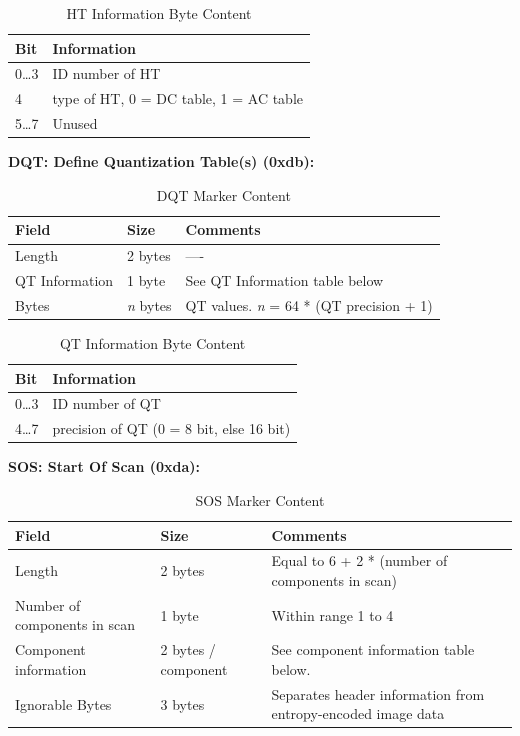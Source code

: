 \begin{table}[!hbtp]
	\caption{HT Information Byte Content}
	\centering
	\begin{tabular}{ | p{2cm} | p{4cm} | }
	\hline
	\textbf{Bit} &  \textbf{Information} \\ \hline
	0\ldots3 & ID number of HT\\ \hline
	4 & type of HT, 0 = DC table, 1 = AC table\\ \hline
	5\ldots7 & Unused\\ \hline
	\end{tabular}
\end{table}

\textbf{DQT: Define Quantization Table(s) (0xdb):}

\begin{table}[!hbtp]
	\caption{DQT Marker Content}
	\centering
	\begin{tabular}{ | p{2cm} | p{1.5cm} | p{4cm} | }
	\hline
	\textbf{Field} & \textbf{Size} & \textbf{Comments} \\ \hline
	Length & 2 bytes & ----\\ \hline
	QT Information & 1 byte & See QT Information table below\\ \hline
	Bytes  & \emph{n} bytes & QT values. \emph{n} = 64 * (QT precision + 1) \\ \hline
	\end{tabular}
\end{table}

\begin{table}[!hbtp]
	\caption{QT Information Byte Content}
	\centering
	\begin{tabular}{ | p{2cm} | p{4cm} | }
	\hline
	\textbf{Bit} &  \textbf{Information} \\ \hline
	0\ldots3 & ID number of QT\\ \hline
	4\ldots7 & precision of QT (0 = 8 bit, else 16 bit)\\ \hline
	\end{tabular}
\end{table}

\newpage

\textbf{SOS: Start Of Scan (0xda):}

\begin{table}[!hbtp]
	\caption{SOS Marker Content}
	\centering
	\begin{tabular}{ | p{2cm} | p{1.5cm} | p{4cm} | }
	\hline
	\textbf{Field} & \textbf{Size} & \textbf{Comments} \\ \hline
	Length & 2 bytes & Equal to 6 + 2 * (number of components in scan)\\ \hline
	Number of components in scan & 1 byte & Within range 1 to 4\\ \hline
	Component information & 2 bytes / component & See component information table below.\\ \hline
	Ignorable Bytes & 3 bytes & Separates header information from entropy-encoded image data\\ \hline
	\end{tabular}
\end{table}

